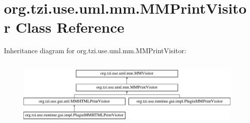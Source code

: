 \hypertarget{classorg_1_1tzi_1_1use_1_1uml_1_1mm_1_1_m_m_print_visitor}{\section{org.\-tzi.\-use.\-uml.\-mm.\-M\-M\-Print\-Visitor Class Reference}
\label{classorg_1_1tzi_1_1use_1_1uml_1_1mm_1_1_m_m_print_visitor}
}
Inheritance diagram for org.\-tzi.\-use.\-uml.\-mm.\-M\-M\-Print\-Visitor\-:\begin{figure}[H]
\begin{center}
\leavevmode
\includegraphics[height=3.414634cm]{classorg_1_1tzi_1_1use_1_1uml_1_1mm_1_1_m_m_print_visitor}
\end{center}
\end{figure}
